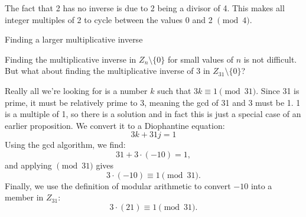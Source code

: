 The fact that 2 has no inverse is due to 2 being a divisor of 4.  This makes all integer multiples of 2 to cycle between the values 0 and 2 $\pmod 4$. 


\begin{example}{Finding a larger multiplicative inverse}


Finding the multiplicative inverse in $Z_n \setminus \{0\}$ for small values of $n$  is not difficult.  But what about finding the multiplicative inverse of 3 in $Z_{31}\setminus \{0\}$?  

% 





Really all we're looking for is a number $k$ such that $3k \equiv 1 \pmod {31}$.  Since 31 is prime, it must be relatively prime to 3, meaning the gcd of 31 and 3 must be 1.  1 is a multiple of 1, so there is a solution and in fact this is just a special case of an earlier proposition.  We convert it to a Diophantine equation:
\[3k + 31j = 1\]
Using the gcd algorithm, we find:
\[31+3\cdot(-10) = 1,\]
and applying $\pmod{31}$ gives
\[3\cdot(-10) \equiv 1 \pmod{31}.\]
Finally, we use the definition of modular arithmetic to convert $-10$ into a member in $Z_{31}$:
\[3\cdot(21) \equiv 1 \pmod{31}.\] 
\end{example}


